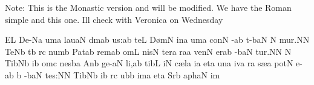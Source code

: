 

Note: This is the Monastic version and will be modified. We have the Roman simple and this one. Ill check with Veronica on Wednesday


\Internote
{}
\initiumgregorianum
{}%
\sgn {}E{}\punctum L\egn
\spatium
\sgn De-\pes Na\egn
\sgn {}um\punctum a\egn
\spatium
\sgn lau\cephalicus aN\egn
\sgn d{\a}m\pes ab\egn
\sgn {}u{s:}\punctum a\augmentum b\egn
\spatium
\Asteriscus
\divisiominor
\spatium
\sgn te{}\punctum L\egn
\spatium
\sgn D{\o}m\punctum N\egn
\sgn {}in\punctum a\egn
\sgn {}um\punctum a\egn
\spatium
\sgn con\punctum N\egn
{}-\pes ab\egn
\sgn t{\e}-\climacus baN\egn
\custos N
\lineaproxima
\sgn mu{r.}\punctum N\augmentum N\egn
\spatium
\divisiofinalis
\spatium
\sgn Te{}\pes Nb\egn
\spatium
\sgn {}{\ae}t\punctum b\egn
\sgn {}{\e}r\punctum c\egn
\sgn num\punctum b\egn
\spatium
\sgn Pat\pes ab\egn
\sgn rem\punctum a\augmentum b\egn
\spatium
\divisiominor
\spatium
\sgn {}om\punctum L\egn
\sgn nis\punctum N\egn
\spatium
\sgn ter\punctum a\egn
\sgn ra{}\punctum a\egn
\spatium
\sgn ven\punctum N\egn
\sgn {}er\pes ab\egn
\sgn {}{\a}-\climacus baN\egn
\sgn tu{r.}\punctum N\augmentum N\egn
\spatium
\divisiofinalis
\spatium
\custos N
\lineaproxima
\sgn Tib\pes Nb\egn
\sgn {}i{}\punctum b\egn
\spatium
\sgn {}om\punctum c\egn
\sgn nes\clivis ba\egn
\spatium
\sgn {}An\punctum b\egn
\sgn ge-\clivis aN\egn
\sgn li,\punctum a\augmentum b\egn
\spatium
\divisiominor
\spatium
\sgn tib\punctum L\egn
\sgn {}i{}\punctum N\egn
\spatium
\sgn c{\ae}l\punctum a\egn
\sgn {}i{}\punctum a\egn
\spatium
\sgn {}et\punctum a\egn
\spatium
\sgn {}un\punctum a\egn
\sgn {}iv\punctum a\egn
\sgn {}{\e}r\punctum a\egn
\sgn s{\ae}{}\punctum a\egn
\spatium
\sgn pot\punctum N\egn
\sgn {}e-\pes ab\egn
\custos b
\lineaproxima
{}-\climacus baN\egn
\sgn te{s:}\punctum N\augmentum N\egn
\spatium
\divisiofinalis
\spatium
\sgn Tib\pes Nb\egn
\sgn {}i{}\punctum b\egn
\spatium
{}r\punctum c\egn
\sgn {}ub\punctum b\egn
\sgn {}im\punctum a\egn
\spatium
\sgn {}et\punctum a\egn
\spatium
\sgn S{\e}r\punctum b\egn
\sgn {}a{ph}\clivis aN\egn
\sgn {}im%
